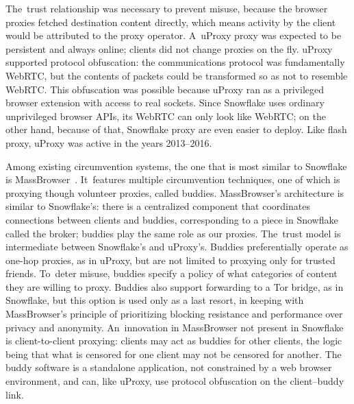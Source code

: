 \documentclass[letterpaper,twocolumn]{article}
\begin{document}
The~trust relationship was necessary to prevent misuse,
because the browser proxies fetched destination content directly,
which means activity by the client would be attributed to the proxy operator.
A~uProxy proxy was expected to be
persistent and always online;
clients did not change proxies on the fly.
uProxy supported protocol obfuscation:
the communications protocol was fundamentally WebRTC,
but the contents of packets could be transformed so as not to resemble WebRTC.
This obfuscation was possible because uProxy ran as a privileged browser extension
with access to real sockets.
Since Snowflake uses ordinary unprivileged browser APIs,
its WebRTC can only look like WebRTC;
on the other hand, because of that,
Snowflake proxy are even easier to deploy.
Like flash proxy, uProxy was active in the years
2013--2016.

Among existing circumvention systems,
the one that is most similar to Snowflake is MassBrowser~\cite{Nasr2020a}.
It~features multiple circumvention techniques, one of which is
proxying though volunteer proxies, called buddies.
MassBrowser's architecture is similar to Snowflake's:
there is a centralized component that coordinates
connections between clients and buddies,
corresponding to a piece in Snowflake called the broker;
buddies play the same role as our proxies.
The~trust model is intermediate between Snowflake's and uProxy's.
Buddies preferentially operate as one-hop proxies, as in uProxy,
but are not limited to proxying only for trusted friends.
To~deter misuse, buddies specify a policy of
what categories of content they are willing to proxy.
Buddies also support forwarding to a Tor bridge, as in Snowflake,
but this option is used only as a last resort,
in keeping with MassBrowser's principle
of prioritizing blocking resistance and performance
over privacy and anonymity.
An~innovation in MassBrowser not present in Snowflake is client-to-client proxying:
clients may act as buddies for other clients,
the logic being that what is censored for one client may not be censored for another.
The buddy software is a standalone application,
not constrained by a web browser environment,
and can, like uProxy, use protocol obfuscation
on the client--buddy link.
\end{document}
